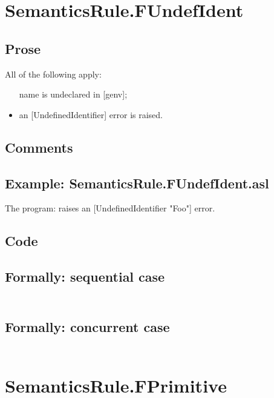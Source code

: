 \documentclass{book}
\begin{document}
\section{SemanticsRule.FUndefIdent \label{sec:SemanticsRule.FUndefIdent}}

  \subsection{Prose}
  All of the following apply:
  \begin{itemize}
  \item [name] is undeclared in [genv];
  \item an [UndefinedIdentifier] error is raised.
  \end{itemize}

  \subsection{Comments}

  \subsection{Example: SemanticsRule.FUndefIdent.asl}
  The program:
  raises an [UndefinedIdentifier "Foo"] error.

  \subsection{Code}

  \subsection{Formally: sequential case}
  \begin{align}
  \end{align} 

  \subsection{Formally: concurrent case}
  \begin{align}
  \end{align} 

\section{SemanticsRule.FPrimitive \label{sec:SemanticsRule.FPrimitive}}
\end{document}
